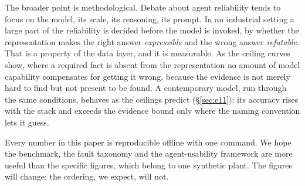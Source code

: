 The broader point is methodological. Debate about agent reliability tends to
focus on the model, its scale, its reasoning, its prompt. In an industrial
setting a large part of the reliability is decided before the model is invoked,
by whether the representation makes the right answer \emph{expressible} and the
wrong answer \emph{refutable}. That is a property of the data layer, and it is
measurable. As the ceiling curves show, where a required fact is absent from the
representation no amount of model capability compensates for getting it wrong,
because the evidence is not merely hard to find but not present to be found. A
contemporary model, run through the same conditions, behaves as the ceilings
predict (\S\ref{sec:e11}): its accuracy rises with the stack and exceeds the
evidence bound only where the naming convention lets it guess.

Every number in this paper is reproducible offline with one command. We hope the
benchmark, the fault taxonomy and the agent-usability framework are more useful
than the specific figures, which belong to one synthetic plant. The figures will
change; the ordering, we expect, will not.
